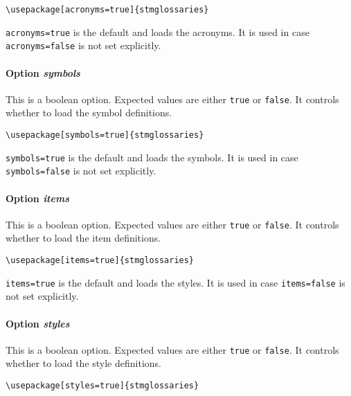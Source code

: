 \documentclass[%
  type=article,%
  layout=koma,%
  hyperref=true,%
  conditionallox=true,%
  conditionalloxnewpage=false,%
  date=true,%
  index=true,%
  listings=true%
]{stmtext}
\begin{document}
\begin{verbatim}
\usepackage[acronyms=true]{stmglossaries}
\end{verbatim}

\texttt{acronyms=true} is the default and loads the acronyms. It is used in case \texttt{acronyms=false} is not set explicitly.

\paragraph{Option \protect\textit{symbols}}
\label{sec:usage:preamble:wholepackage:options:symbols}

This is a boolean option. Expected values are either \texttt{true} or \texttt{false}. It controls whether to load the symbol definitions.

\begin{verbatim}
\usepackage[symbols=true]{stmglossaries}
\end{verbatim}

\texttt{symbols=true} is the default and loads the symbols. It is used in case \texttt{symbols=false} is not set explicitly.

\paragraph{Option \protect\textit{items}}
\label{sec:usage:preamble:wholepackage:options:items}

This is a boolean option. Expected values are either \texttt{true} or \texttt{false}. It controls whether to load the item definitions.

\begin{verbatim}
\usepackage[items=true]{stmglossaries}
\end{verbatim}

\texttt{items=true} is the default and loads the styles. It is used in case \texttt{items=false} is not set explicitly.

\paragraph{Option \protect\textit{styles}}
\label{sec:usage:preamble:wholepackage:options:styles}

This is a boolean option. Expected values are either \texttt{true} or \texttt{false}. It controls whether to load the style definitions.

\begin{verbatim}
\usepackage[styles=true]{stmglossaries}
\end{verbatim}
\end{document}
